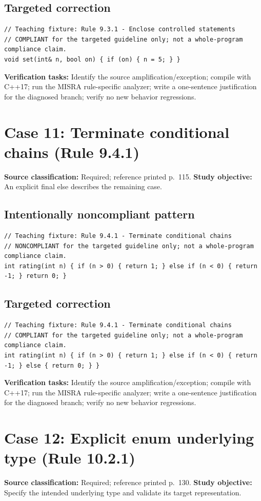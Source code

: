 \documentclass[10pt,letterpaper]{article}
\begin{document}
\subsection*{Targeted correction}
\begin{lstlisting}
// Teaching fixture: Rule 9.3.1 - Enclose controlled statements
// COMPLIANT for the targeted guideline only; not a whole-program compliance claim.
void set(int& n, bool on) { if (on) { n = 5; } }
\end{lstlisting}
\textbf{Verification tasks:} Identify the source amplification/exception; compile with C++17; run the MISRA rule-specific analyzer; write a one-sentence justification for the diagnosed branch; verify no new behavior regressions.

\section{Case 11: Terminate conditional chains (Rule 9.4.1)}
\textbf{Source classification:} Required; reference printed p.~115. \textbf{Study objective:} An explicit final else describes the remaining case.
\subsection*{Intentionally noncompliant pattern}
\begin{lstlisting}
// Teaching fixture: Rule 9.4.1 - Terminate conditional chains
// NONCOMPLIANT for the targeted guideline only; not a whole-program compliance claim.
int rating(int n) { if (n > 0) { return 1; } else if (n < 0) { return -1; } return 0; }
\end{lstlisting}
\subsection*{Targeted correction}
\begin{lstlisting}
// Teaching fixture: Rule 9.4.1 - Terminate conditional chains
// COMPLIANT for the targeted guideline only; not a whole-program compliance claim.
int rating(int n) { if (n > 0) { return 1; } else if (n < 0) { return -1; } else { return 0; } }
\end{lstlisting}
\textbf{Verification tasks:} Identify the source amplification/exception; compile with C++17; run the MISRA rule-specific analyzer; write a one-sentence justification for the diagnosed branch; verify no new behavior regressions.

\section{Case 12: Explicit enum underlying type (Rule 10.2.1)}
\textbf{Source classification:} Required; reference printed p.~130. \textbf{Study objective:} Specify the intended underlying type and validate its target representation.
\end{document}
